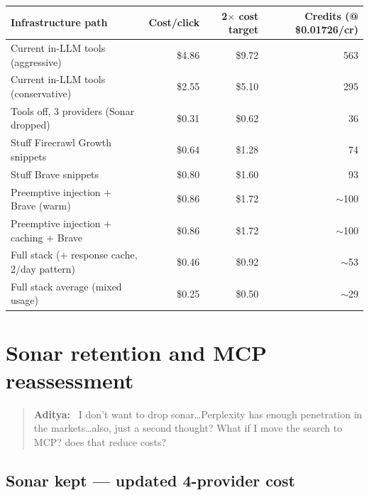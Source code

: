 \documentclass[11pt,letterpaper]{article}
\newenvironment{userturn}
  {\begin{quote}\small\color{brand}\textbf{Aditya:}~}
  {\end{quote}}
\begin{document}
\begin{center}
\begin{tabular}{@{}lrrr@{}}
\toprule
\textbf{Infrastructure path} & \textbf{Cost/click} & \textbf{2$\times$ cost target} & \textbf{Credits (@ \$0.01726/cr)} \\
\midrule
Current in-LLM tools (aggressive)             & \$4.86 & \$9.72 & 563 \\
Current in-LLM tools (conservative)           & \$2.55 & \$5.10 & 295 \\
Tools off, 3 providers (Sonar dropped)        & \$0.31 & \$0.62 & 36 \\
Stuff Firecrawl Growth snippets               & \$0.64 & \$1.28 & 74 \\
Stuff Brave snippets                          & \$0.80 & \$1.60 & 93 \\
Preemptive injection $+$ Brave (warm)         & \$0.86 & \$1.72 & $\sim$100 \\
Preemptive injection $+$ caching $+$ Brave    & \$0.86 & \$1.72 & $\sim$100 \\
Full stack ($+$ response cache, 2/day pattern) & \$0.46 & \$0.92 & $\sim$53 \\
Full stack average (mixed usage)              & \$0.25 & \$0.50 & $\sim$29 \\
\bottomrule
\end{tabular}
\end{center}

\section{Sonar retention and MCP reassessment}

\begin{userturn}
I don't want to drop sonar\ldots Perplexity has enough penetration in the
markets\ldots also, just a second thought? What if I move the search to MCP?
does that reduce costs?
\end{userturn}

\subsection{Sonar kept --- updated 4-provider cost}
\end{document}
